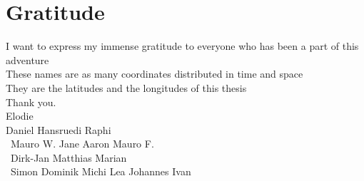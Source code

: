
\bigskip

\begingroup
\let\clearpage\relax
\let\cleardoublepage\relax
\let\cleardoublepage\relax
\chapter*{Gratitude}

\def\thanks#1{%
\begingroup
\leftskip1em
\noindent #1
\par
\endgroup
}

I want to express my immense gratitude to everyone who has been a part of this adventure\\ 

\noindent These names are as many coordinates distributed in time and space\\

\noindent They are the latitudes and the longitudes of this thesis\\

\noindent Thank you. \\

\hspace{4cm}  Elodie \\

\hspace{1cm}  Daniel \hspace{3cm} \hspace{1cm} Hansruedi \hspace{3.5cm}Raphi \\

\ Mauro W. \hspace{2cm} Jane \hspace{1cm} Aaron \hspace{4cm} Mauro F.\\

\ \hspace{2cm}Dirk-Jan \hspace{6cm} Matthias \hspace{2cm} Marian\\

\ Simon \hspace{1.9cm} Dominik \hspace{1.4cm} Michi \hspace{0.7cm} Lea \hspace{0.9cm} Johannes \hspace{1.9cm}Ivan \\

